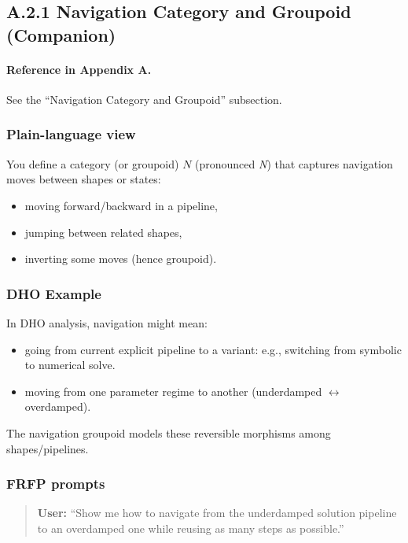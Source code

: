 \subsection{A.2.1 Navigation Category and Groupoid (Companion)}

\paragraph{Reference in Appendix A.}
See the ``Navigation Category and Groupoid'' subsection.

\subsubsection*{Plain-language view}

You define a category (or groupoid) $N$ (pronounced \emph{N}) that captures navigation moves between
shapes or states:

\begin{itemize}
 \item moving forward/backward in a pipeline,
 \item jumping between related shapes,
 \item inverting some moves (hence groupoid).
\end{itemize}

\subsubsection*{DHO Example}

In DHO analysis, navigation might mean:

\begin{itemize}
 \item going from current explicit pipeline to a variant: e.g., switching from symbolic to numerical
 solve.
 \item moving from one parameter regime to another (underdamped $\leftrightarrow$ overdamped).
\end{itemize}

The navigation groupoid models these reversible morphisms among shapes/pipelines.

\subsubsection*{FRFP prompts}

\begin{quote}
\textbf{User:} 
``Show me how to navigate from the underdamped solution pipeline to an overdamped one while reusing as many steps as possible.'' 
\end{quote}

